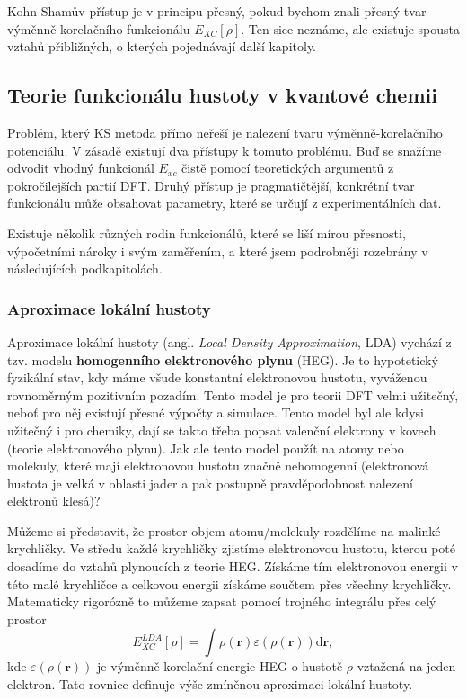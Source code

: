 Kohn-Shamův přístup je v principu přesný, pokud bychom znali přesný tvar výměnně-korelačního funkcionálu $E_{XC}[\rho]$.
Ten sice neznáme, ale existuje spousta vztahů přibližných, o kterých pojednávají další kapitoly.

\subsection{Teorie funkcionálu hustoty v kvantové chemii}

Problém, který KS metoda přímo neřeší je nalezení tvaru výměnně-korelačního potenciálu.
V zásadě existují dva přístupy k tomuto problému. Buď se snažíme odvodit vhodný funkcionál $E_{xc}$ čistě pomocí teoretických argumentů z pokročilejších partií DFT. Druhý přístup je pragmatičtější, konkrétní tvar funkcionálu může obsahovat parametry, které se určují z experimentálních dat.

Existuje několik různých rodin funkcionálů, které se liší mírou přesnosti, výpočetními nároky i svým zaměřením, a které jsem podrobněji rozebrány v následujících podkapitolách.

\subsubsection{Aproximace lokální hustoty}

Aproximace lokální hustoty (angl. \textit{Local Density Approximation}, LDA) vychází z tzv. modelu \textbf{homogenního elektronového plynu} (HEG). Je to hypotetický fyzikální stav, kdy máme všude konstantní elektronovou hustotu, vyváženou rovnoměrným pozitivním pozadím. Tento model je pro teorii DFT velmi užitečný, neboť pro něj existují přesné výpočty a simulace. Tento model byl ale kdysi užitečný i pro chemiky, dají se takto třeba popsat valenční elektrony v kovech (teorie elektronového plynu). Jak ale tento model použít na atomy nebo molekuly, které mají elektronovou hustotu značně nehomogenní (elektronová hustota je velká v oblasti jader a pak postupně pravděpodobnost nalezení elektronů klesá)?

Můžeme si představit, že prostor objem atomu/molekuly rozdělíme na malinké krychličky. Ve středu každé krychličky zjistíme elektronovou hustotu, kterou poté dosadíme do vztahů plynoucích z teorie HEG.
Získáme tím elektronovou energii v této malé krychličce a celkovou energii získáme součtem přes všechny krychličky. Matematicky rigorózně to můžeme zapsat pomocí trojného integrálu přes celý prostor
\begin{equation}
E_{XC}^{LDA}[\rho]=\int \rho(\textbf{r}) \varepsilon(\rho(\textbf{r})) \mathrm{d}\textbf{r} ,
\end{equation}
kde $\varepsilon(\rho(\textbf{r}))$ je výměnně-korelační energie HEG o hustotě $\rho$ vztažená na jeden elektron. Tato rovnice definuje výše zmíněnou aproximaci lokální hustoty.

